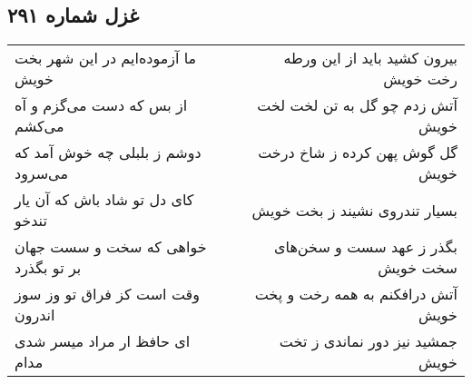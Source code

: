 \begin{center}
\section*{غزل شماره ۲۹۱}
\label{sec:sh291}
\begin{longtable}{l p{0.5cm} r}
ما آزموده‌ایم در این شهر بخت خویش
&&
بیرون کشید باید از این ورطه رخت خویش
\\
از بس که دست می‌گزم و آه می‌کشم
&&
آتش زدم چو گل به تن لخت لخت خویش
\\
دوشم ز بلبلی چه خوش آمد که می‌سرود
&&
گل گوش پهن کرده ز شاخ درخت خویش
\\
کای دل تو شاد باش که آن یار تندخو
&&
بسیار تندروی نشیند ز بخت خویش
\\
خواهی که سخت و سست جهان بر تو بگذرد
&&
بگذر ز عهد سست و سخن‌های سخت خویش
\\
وقت است کز فراق تو وز سوز اندرون
&&
آتش درافکنم به همه رخت و پخت خویش
\\
ای حافظ ار مراد میسر شدی مدام
&&
جمشید نیز دور نماندی ز تخت خویش
\\
\end{longtable}
\end{center}
